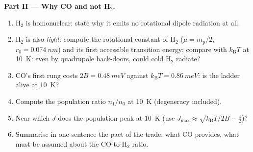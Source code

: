 \begin{problem}
\medskip\noindent\textbf{Part II --- Why CO and not H$_2$.}
\begin{enumerate}[resume]
  \item H$_2$ is homonuclear: state why it emits no rotational
        dipole radiation at all.
  \item H$_2$ is also \emph{light}: compute the rotational constant
        of H$_2$ ($\mu = m_{\text{p}}/2$, $r_0 = \qty{0.074}{nm}$)
        and its first accessible transition energy; compare with
        $k_{\text{B}}T$ at \qty{10}{K}: even by quadrupole
        back-doors, could cold H$_2$ radiate?
  \item CO's first rung costs $2B = \qty{0.48}{meV}$ against
        $k_{\text{B}}T = \qty{0.86}{meV}$: is the ladder alive at
        \qty{10}{K}?
  \item Compute the population ratio $n_1/n_0$ at \qty{10}{K}
        (degeneracy included).
  \item Near which $J$ does the population peak at \qty{10}{K}
        (use $J_{\max} \approx \sqrt{k_{\text{B}}T/2B} - \tfrac12$)?
  \item Summarise in one sentence the pact of the trade: what CO
        provides, what must be assumed about the CO-to-H$_2$
        ratio.
\end{enumerate}


\end{problem}
